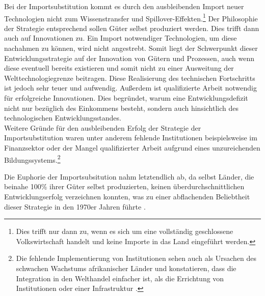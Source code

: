 Bei der Importsubstitution kommt es durch den ausbleibenden Import neuer Technologien nicht zum Wissenstransfer und Spillover-Effekten.\footnote{Dies trifft nur dann zu, wenn es sich um eine vollst{\"a}ndig geschlossene Volkswirtschaft handelt und keine Importe in das Land eingef{\"u}hrt werden.} Der Philosophie der Strategie entsprechend sollen G{\"u}ter selbst produziert werden. Dies trifft dann auch auf Innovationen zu. Ein Import notwendiger Technologien, um diese nachahmen zu k{\"o}nnen, wird nicht angestrebt. Somit liegt der Schwerpunkt dieser Entwicklungsstrategie auf der Innovation von G{\"u}tern und Prozessen, auch wenn diese eventuell bereits existieren und somit nicht zu einer Ausweitung der Welttechnologiegrenze beitragen. Diese Realisierung des technischen Fortschritts ist jedoch sehr teuer und aufwendig. Au{\ss}erdem ist qualifizierte Arbeit notwendig f{\"u}r erfolgreiche Innovationen. Dies begr{\"u}ndet, warum eine Entwicklungsdefizit nicht nur bez{\"u}glich des Einkommens besteht, sondern auch hinsichtlich des technologischen Entwicklungsstandes.\\


Weitere Gr{\"u}nde f{\"u}r den ausbleibenden Erfolg der Strategie der Importsubstitution waren unter anderem fehlende Institutionen beispielsweise im Finanzsektor oder der Mangel qualifizierter Arbeit aufgrund eines unzureichenden Bildungssystems.\footnote{Die fehlende Implementierung von Institutionen sehen auch \citet{Collier.1999} als Ursachen des schwachen Wachstums afrikanischer L{\"a}nder und konstatieren, dass die Integration in den Welthandel einfacher ist, als die Errichtung von Institutionen oder einer Infrastruktur \cite{Collier.1999}.}\newline 


Die Euphorie der Importsubsitution nahm letztendlich ab, da selbst L{\"a}nder, die beinahe 100{\%} ihrer G{\"u}ter selbst produzierten, keinen {\"u}berdurchschnittlichen Entwicklungserfolg verzeichnen konnten, was zu einer abflachenden Beliebtheit dieser Strategie in den 1970er Jahren f{\"u}hrte \cite{LittleIanMalcolmDavid.1970}.\\


